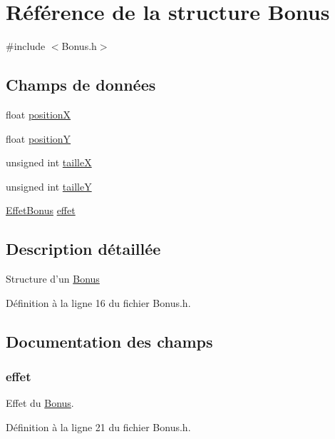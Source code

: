 \hypertarget{struct_bonus}{\section{Référence de la structure Bonus}
\label{struct_bonus}
}


{\ttfamily \#include $<$Bonus.\-h$>$}

\subsection*{Champs de données}
\begin{DoxyCompactItemize}
\item 
float \hyperlink{struct_bonus_a79a982036e5591bf27af7cc2edcd6f4c}{position\-X}
\item 
float \hyperlink{struct_bonus_ad17be35b83017d6dc83074e6b8d21207}{position\-Y}
\item 
unsigned int \hyperlink{struct_bonus_a14a7f2008ff990cae95babeb28176bad}{taille\-X}
\item 
unsigned int \hyperlink{struct_bonus_ab277c464cec35f230262c48fec89a566}{taille\-Y}
\item 
\hyperlink{_effet_bonus_8h_a5c3ffd6a343fb8d5f63c87ee1a37a7fe}{Effet\-Bonus} \hyperlink{struct_bonus_a45c436f89f1ba91da70f3a6351db6c0a}{effet}
\end{DoxyCompactItemize}


\subsection{Description détaillée}
Structure d'un \hyperlink{struct_bonus}{Bonus} 

Définition à la ligne 16 du fichier Bonus.\-h.



\subsection{Documentation des champs}
\hypertarget{struct_bonus_a45c436f89f1ba91da70f3a6351db6c0a}{
\subsubsection[{effet}]{ effet}}\label{struct_bonus_a45c436f89f1ba91da70f3a6351db6c0a}
Effet du \hyperlink{struct_bonus}{Bonus}. 

Définition à la ligne 21 du fichier Bonus.\-h.

